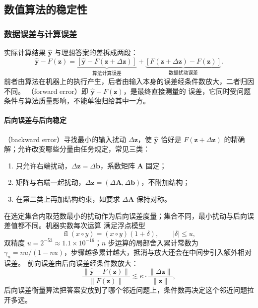 \subsection{数值算法的稳定性}
\label{sec:ls-numerical-stability}

\subsubsection{数据误差与计算误差}
\label{sec:ls-data-computation-error}
\label{sec:linear-algebra-error-propagation}
\label{sec:ch06-error-propagation}

实际计算结果 $\widehat{\bm y}$ 与理想答案的差拆成两段：
\[
 \widehat{\bm y}-F(\bm z)
 =\underbrace{[\widehat{\bm y}-F(\bm z+\Delta\bm z)]}_{\text{算法计算误差}}
 +\underbrace{[F(\bm z+\Delta\bm z)-F(\bm z)]}_{\text{数据扰动误差}}.
\]
前者由算法在机器上的执行产生，后者由输入本身的误差经条件数放大，二者归因不同。
（forward error）即 $\widehat{\bm y}-F(\bm z)$，是最终直接测量的
误差，它同时受问题条件与算法质量影响，不能单独归给其中一方。

\paragraph{后向误差与后向稳定}

（backward error）寻找最小的输入扰动 $\Delta\bm z$，使 $\widehat{\bm y}$
恰好是 $F(\bm z+\Delta\bm z)$ 的精确解；允许改变哪些分量由任务规定，常见三类：
\begin{enumerate}
 \item 只允许右端扰动，$\Delta\bm z=\Delta\bm b$，系数矩阵 $\bm A$ 固定；
 \item 矩阵与右端一起扰动，$\Delta\bm z=(\Delta\bm A,\Delta\bm b)$，不附加结构；
 \item 在第二类上再加结构约束，如要求 $\Delta\bm A$ 保持对称。
\end{enumerate}
在选定集合内取范数最小的扰动作为后向误差度量；集合不同，最小扰动与后向误差值都不同。机器实数每次运算
满足浮点模型
\begin{equation}
 \operatorname{fl}(x\circ y)=(x\circ y)(1+\delta),
 \qquad |\delta|\leq u,
 \label{eq:ch06-floating-point-model}
\end{equation}
双精度 $u=2^{-53}\approx1.1\times10^{-16}$；$n$ 步运算的局部舍入累计常数为
$\gamma_n=nu/(1-nu)$，步骤越多累计越大，抵消与放大还会在中间步引入额外相对误差。
前向误差由后向误差经条件数放大：
\[
 \frac{\lVert\widehat{\bm y}-F(\bm z)\rVert}
      {\lVert F(\bm z)\rVert}
 \lesssim\kappa\cdot\frac{\lVert\Delta\bm z\rVert}{\lVert\bm z\rVert},
\]
后向误差衡量算法把答案安放到了哪个邻近问题上，条件数再决定这个邻近问题拉开多远。

